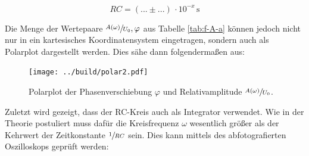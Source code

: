 \begin{equation}
    RC = \left(... \pm ...\right)\,\cdot 10^{-x}\,\unit{\second}
\end{equation}


\noindent Die Menge der Wertepaare ${\sfrac{A(\omega)}{U_0},\varphi}$ aus Tabelle \ref{tab:f-A-a} können jedoch nicht nur in ein kartesisches Koordinatensystem eingetragen, sondern
auch als Polarplot dargestellt werden. Dies sähe dann folgendermaßen aus:

\begin{figure}[H]
    \centering
    \texttt{[image: ../build/polar2.pdf]}
    \caption{Polarplot der Phasenverschiebung $\varphi$ und Relativamplitude $\sfrac{A(\omega)}{U_0}$.}
    \label{fig:polar}
\end{figure}

\noindent Zuletzt wird gezeigt, dass der RC-Kreis auch als Integrator verwendet. Wie in der Theorie postuliert muss dafür die Kreisfrequenz $\omega$
wesentlich größer als der Kehrwert der Zeitkonstante $\sfrac{1}{RC}$ sein. Dies kann mittels des abfotografierten Oszilloskops geprüft werden:

